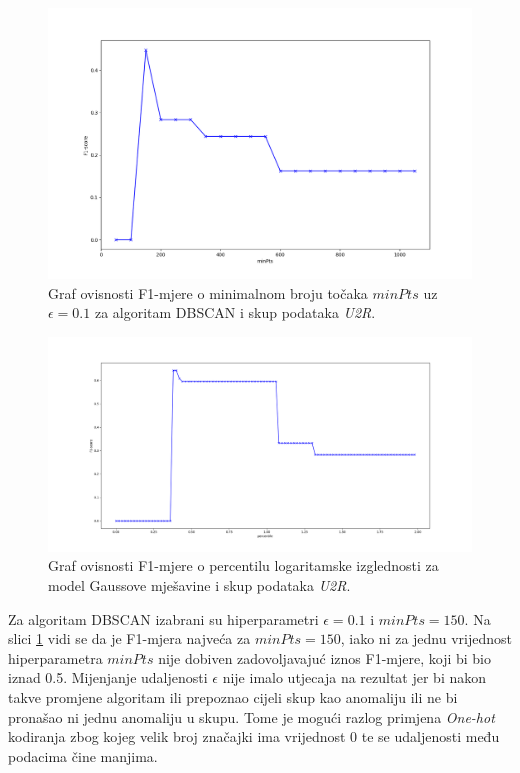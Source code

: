 \documentclass[utf8, diplomski, numeric]{fer}
\begin{document}
\begin{figure}[h!]
\includegraphics[width=1\textwidth]{images/u2r-dbscan-f1.png}
\centering
\caption{Graf ovisnosti F1-mjere o minimalnom broju točaka $minPts$ uz $\epsilon = 0.1$ za algoritam DBSCAN i skup podataka \textit{U2R}.}
\label{fig:u2r-dbscan}
\end{figure}

\begin{figure}[h!]
\includegraphics[width=1\textwidth]{images/u2r-gauss-f1.png}
\centering
\caption{Graf ovisnosti F1-mjere o percentilu logaritamske izglednosti za model Gaussove mješavine i skup podataka \textit{U2R}.}
\label{fig:u2r-gauss}
\end{figure}

Za algoritam DBSCAN izabrani su hiperparametri $\epsilon = 0.1$ i $minPts = 150$. Na slici \ref{fig:u2r-dbscan} vidi se da je F1-mjera najveća za $minPts = 150$, iako ni za jednu vrijednost hiperparametra $minPts$ nije dobiven zadovoljavajuć iznos F1-mjere, koji bi bio iznad 0.5. Mijenjanje udaljenosti $\epsilon$ nije imalo utjecaja na rezultat jer bi nakon takve promjene algoritam ili prepoznao cijeli skup kao anomaliju ili ne bi pronašao ni jednu anomaliju u skupu. Tome je mogući razlog primjena \textit{One-hot} kodiranja zbog kojeg velik broj značajki ima vrijednost 0 te se udaljenosti među podacima čine manjima.
\end{document}
